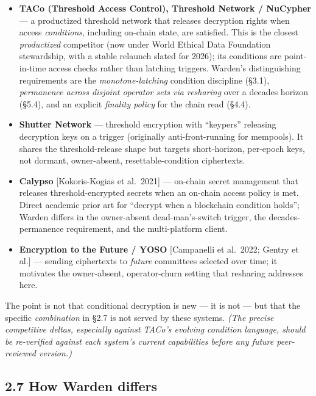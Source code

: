 \documentclass[
  11pt,
]{article}
\providecommand{\tightlist}{%
  \setlength{\itemsep}{0pt}\setlength{\parskip}{0pt}}
\begin{document}
\begin{itemize}
\tightlist
\item
  \textbf{TACo (Threshold Access Control), Threshold Network / NuCypher}
  --- a productized threshold network that releases decryption rights
  when access \emph{conditions}, including on-chain state, are
  satisfied. This is the closest \emph{productized} competitor (now
  under World Ethical Data Foundation stewardship, with a stable
  relaunch slated for 2026); its conditions are point-in-time access
  checks rather than latching triggers. Warden's distinguishing
  requirements are the \emph{monotone-latching} condition discipline
  (§3.1), \emph{permanence across disjoint operator sets via resharing}
  over a decades horizon (§5.4), and an explicit \emph{finality policy}
  for the chain read (§4.4).
\item
  \textbf{Shutter Network} --- threshold encryption with ``keypers''
  releasing decryption keys on a trigger (originally anti-front-running
  for mempools). It shares the threshold-release shape but targets
  short-horizon, per-epoch keys, not dormant, owner-absent,
  resettable-condition ciphertexts.
\item
  \textbf{Calypso} {[}Kokoris-Kogias et al.~2021{]} --- on-chain secret
  management that releases threshold-encrypted secrets when an on-chain
  access policy is met. Direct academic prior art for ``decrypt when a
  blockchain condition holds''; Warden differs in the owner-absent
  dead-man's-switch trigger, the decades-permanence requirement, and the
  multi-platform client.
\item
  \textbf{Encryption to the Future / YOSO} {[}Campanelli et al.~2022;
  Gentry et al.{]} --- sending ciphertexts to \emph{future} committees
  selected over time; it motivates the owner-absent, operator-churn
  setting that resharing addresses here.
\end{itemize}

The point is not that conditional decryption is new --- it is not ---
but that the specific \emph{combination} in §2.7 is not served by these
systems. \emph{(The precise competitive deltas, especially against
TACo's evolving condition language, should be re-verified against each
system's current capabilities before any future peer-reviewed version.)}

\subsection{2.7 How Warden differs}\label{how-warden-differs}
\end{document}
